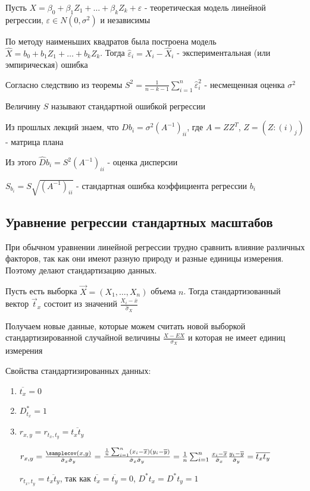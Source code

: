 \documentclass[12pt]{article}
\begin{document}
Пусть $X = \beta_0 + \beta_1 Z_1 + \dots + \beta_k Z_k + \varepsilon$ - теоретическая модель линейной регрессии, $\varepsilon \in N(0, \sigma^2)$ и независимы

По методу наименьших квадратов была построена модель $\hat X = b_0 + b_1 Z_1 + \dots + b_k Z_k$. Тогда $\hat \varepsilon_i = X_i - \hat X_i$ - экспериментальная (или эмпирическая) ошибка

Согласно следствию из теоремы $S^2 = \frac{1}{n - k - 1} \sum_{i = 1}^n \hat \varepsilon_i^2$ - несмещенная оценка $\sigma^2$

\Def Величину $S$ называют стандартной ошибкой регрессии 

Из прошлых лекций знаем, что $D b_i = \sigma^2 (A^{-1})_{ii}$, где $A = Z Z^T$, $Z = (Z:{(i)}_j)$ - матрица плана

Из этого $\hat D b_i = S^2 (A^{-1})_{ii}$ - оценка дисперсии

\Def $S_{b_i} = S \sqrt{(A^{-1})_{ii}}$ - стандартная ошибка коэффициента регрессии $b_i$

\subsection{Уравнение регрессии стандартных масштабов}

\hypertarget{standard_regression_equation}{}

\Nota При обычном уравнении линейной регрессии трудно сравнить влияние различных факторов, так как они имеют 
разную природу и разные единицы измерения. Поэтому делают стандартизацию данных. 

Пусть есть выборка $\vec X = (X_1, \dots, X_n)$ объема $n$. Тогда стандартизованный вектор $\vec t_x$ состоит из значений $\frac{X_i - \overline{x}}{\hat \sigma_X}$

Получаем новые данные, которые можем считать новой выборкой стандартизированной случайной величины $\frac{X - EX}{\sigma_X}$ и которая не имеет единиц измерения

Свойства стандартизированных данных:

\begin{enumerate}
    \item $\overline{t_x} = 0$
    \item $D^*_{t_x} = 1$
    \item $r_{x,y} = r_{t_x, t_y} = \overline{t_x t_y}$
    \begin{MyProof}
        $r_{x,y} = \frac{\samplecov(x, y)}{\hat \sigma_x \hat \sigma_y} = 
        \frac{\frac{1}{n} \sum_{i = 1}^n (x_i - \overline{x})(y_i - \overline{y})}{\hat \sigma_x \hat \sigma_y} = 
        \frac{1}{n} \sum_{i = 1}^n \frac{x_i - \overline{x}}{\hat \sigma_x} \frac{y_i - \overline{y}}{\hat \sigma_y} = \overline{t_x t_y}$

        $r_{t_x, t_y} = \overline{t_x t_y}$, так как $\overline{t_x} = \overline{t_y} = 0$, $D^* t_x = D^* t_y = 1$
    \end{MyProof}
\end{enumerate}
\end{document}
